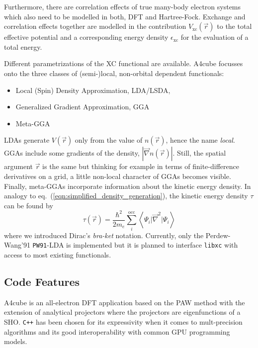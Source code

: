 \documentclass[oribibl]{llncs}
\newcommand{\um}[1]{_{\mathrm{#1}}}
\newcommand{\ttt}[1]{\texttt{#1}}
\newcommand{\braketop}[3]{\left\langle \left. #1 \right| #2 \left| #3 \right. \right\rangle}
\newcommand{\codename}{A4cube}
\begin{document}
Furthermore, there are correlation effects of true many-body electron systems
which also need to be modelled in both, \ac{DFT} and Hartree-Fock.
Exchange and correlation effects together are modelled in the contribution $V\um{xc}(\vec r)$ 
to the total effective potential and a corresponding energy density $\epsilon\um{xc}$ for the evaluation of a total energy.

Different parametrizations of the \ac{XC} functional are available.
\codename{} focusses onto the three classes of (semi-)local, non-orbital dependent functionals: 
\begin{itemize}
	\item Local (Spin) Density Approximation, LDA/LSDA, 
	\item Generalized Gradient Approximation, GGA
	\item Meta-GGA
\end{itemize}
LDAs generate $V(\vec r)$ only from the value of $n(\vec r)$, 
hence the name \emph{local}. 
GGAs include some gradients of the density, $|\vec \nabla n(\vec r)|$.
Still, the spatial argument $\vec r$ is the same but thinking for example
in terms of finite-difference derivatives on a grid, 
a little non-local character of GGAs becomes visible.
Finally, meta-GGAs incorporate information about the kinetic energy density.
In analogy to eq.~(\ref{eqn:simplified_density_generation}), the kinetic energy density $\tau$ can be found by
\begin{equation}
	\tau(\vec r) = \frac{\hbar^2}{2m_e} \sum_i^{\mathrm{occ}} \braketop{ \Psi_i } {\vec \nabla^2 } { \Psi_i } 
	\label{eqn:simplified_kinetic_energy_density_generation}
\end{equation}
where we introduced Dirac's \emph{bra-ket} notation.
Currently, only the 
Perdew-Wang'91 \ttt{PW91}-LDA is implemented
but it is planned to interface \ttt{libxc} with access to most existing functionals.

\subsection{Code Features} \label{sec:features}
%
\codename{} is an all-electron \ac{DFT} application 
based on the \ac{PAW} method \cite{PhysRevB.50.17953} %
with the extension of analytical projectors \cite{BaumeisterTsukamoto2019}
where the projectors are eigenfunctions of a \ac{SHO}.
\ttt{C++} has been chosen for its expressivity
when it comes to mult-precision algorithms 
and its good interoperability with common \ac{GPU} programming models.
\end{document}
